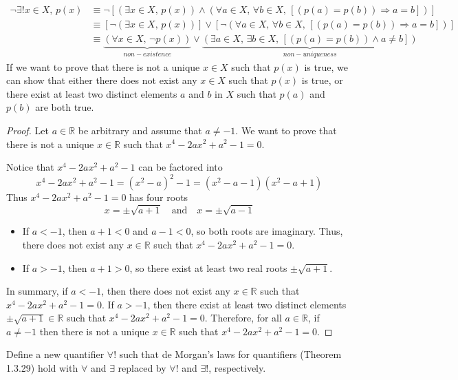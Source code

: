 \begin{mysolution}
    \fixlistskip
    \begin{align*}
        \neg \exists! x \in X,\, p(x) &\equiv \neg [(\exists x \in X,\, p(x)) \wedge (\forall a \in X,\, \forall b \in X,\, [(p(a)=p(b)) \Rightarrow a=b])]\\
        & \equiv [\neg (\exists x \in X,\, p(x))] \vee [\neg (\forall a \in X,\, \forall b \in X,\, [(p(a)=p(b)) \Rightarrow a=b])]\\
        & \equiv \underbrace{(\forall x \in X,\, \neg p(x))}_{non-existence} \vee \underbrace{(\exists a \in X,\, \exists b \in X,\, [(p(a)=p(b)) \wedge a \ne b])}_{non-uniqueness}
    \end{align*}
    If we want to prove that there is not a unique $x \in X$ such that $p(x)$ is true, we can show that either there does not exist any $x \in X$ such that $p(x)$ is true, or there exist at least two distinct elements $a$ and $b$ in $X$ such that $p(a)$ and $p(b)$ are both true.

    \begin{proof}
        Let $a \in \mathbb{R}$ be arbitrary and assume that $a \ne -1$. We want to prove that there is not a unique $x \in \mathbb{R}$ such that $x^4-2ax^2+a^2-1=0$.

        Notice that $x^4-2ax^2+a^2-1$ can be factored into
        \[x^4-2ax^2+a^2-1 = (x^2-a)^2-1 = (x^2-a-1)(x^2-a+1)\]
        Thus $x^4-2ax^2+a^2-1=0$ has four roots
        \[x = \pm\sqrt{a+1} \quad \text{and} \quad x = \pm\sqrt{a-1}\]
        \begin{itemize}
            \item If $a<-1$, then $a+1<0$ and $a-1<0$, so both roots are imaginary. Thus, there does not exist any $x \in \mathbb{R}$ such that $x^4-2ax^2+a^2-1=0$.
            \item If $a>-1$, then $a+1>0$, so there exist at least two real roots $\pm\sqrt{a+1}$.
        \end{itemize}
        In summary, if $a<-1$, then there does not exist any $x \in \mathbb{R}$ such that $x^4-2ax^2+a^2-1=0$. If $a>-1$, then there exist at least two distinct elements $\pm\sqrt{a+1} \in \mathbb{R}$ such that $x^4-2ax^2+a^2-1=0$. Therefore, for all $a \in \mathbb{R}$, if $a \ne -1$ then there is not a unique $x \in \mathbb{R}$ such that $x^4-2ax^2+a^2-1=0$.
    \end{proof}
\end{mysolution}

\begin{chapex}
Define a new quantifier $\forall !$ such that de Morgan's laws for quantifiers (Theorem 1.3.29) hold with $\forall$ and $\exists$ replaced by $\forall !$ and $\exists !$, respectively.
\end{chapex}

